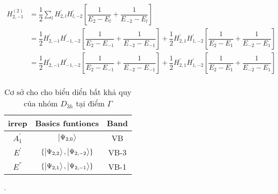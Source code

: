 \documentclass{report}
\newcommand{\f}[2]{\dfrac{#1}{#2}}
\begin{document}
\begin{align*}
	H_{2,-1}^{(2)}
	 & = \f{1}{2} \sum_{l} H_{2,l}^{'}H_{l,-2}^{'}\left[ \f{1}{ E_{2} - E_{l}} + \f{1}{ E_{-2} - E_{l} } \right]                                                                                                      \\
	 & = \f{1}{2} H_{2,-1}^{'}H_{-1,-2}^{'}\left[ \f{1}{ E_{2} - E_{-1}} + \f{1}{ E_{-2} - E_{-1} } \right] + \f{1}{2} H_{2,1}^{'}H_{1,-2}^{'} \left[ \f{1}{ E_{2} - E_{1}} + \f{1}{ E_{-2} - E_{1} } \right]         \\	
	 & = \f{1}{2} H_{2,-1}^{'}H_{-1,-2}^{'}\left[ \f{1}{ E_{2} - E_{-1}} + \f{1}{ E_{-2} - E_{-1} } \right] + \f{1}{2} H_{2,1}^{'}H_{1,-2}^{'} \left[ \f{1}{ E_{2} - E_{1}} + \f{1}{ E_{-2} - E_{1} } \right]         \\
\end{align*}























\newpage
\begin{table}[h!]
	\centering
	\begin{tabular}{c  c  c}
		\hline
		\hline
		irrep       & Basics funtioncs                           & Band \\ [0.6ex]
		\hline
		$A_{1}^{'}$ & $\ket{\Psi_{2,0}}$                         & VB   \\
		$E_{}^{'}$  & $\{ \ket{\Psi_{2,2}},\ket{\Psi_{2,-2}} \}$ & VB-3 \\
		$E_{}^{''}$ & $\{ \ket{\Psi_{2,1}},\ket{\Psi_{2,-1}} \}$ & VB-1 \\
		\hline
	\end{tabular}
	\caption{Cơ sở cho cho biểu diển bất khả quy của nhóm $D_{3h}$ tại điểm $\Gamma$}.
\end{table}
\end{document}
